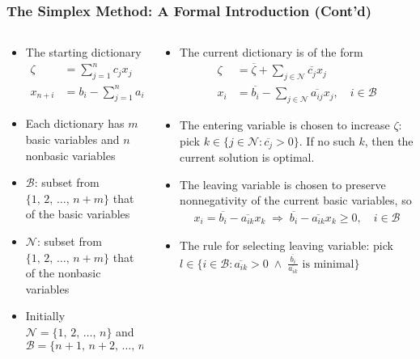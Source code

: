 \documentclass[usenames,dvipsnames,8pt]{beamer}%
\begin{document}
\begin{frame}
  \frametitle{The Simplex Method: A Formal Introduction (Cont'd)}
  \begin{columns}
    \begin{column}{0.5\textwidth}
      \vspace{-5mm}
      \begin{itemize}
        \item The starting dictionary
          \begin{align*}
            \zeta   &= \sum_{j=1}^n c_j x_j \\
            x_{n+i} &= b_i - \sum_{j=1}^n a_{ij}x_j,\quad i = 1, 2, \ldots, m
          \end{align*}
        \item Each dictionary has $m$ basic variables and $n$ nonbasic variables
        \item $\mathcal{B}$: subset from $\{1,\,2,\,\ldots,\,n+m\}$ that of the basic variables
        \item $\mathcal{N}$: subset from $\{1,\,2,\,\ldots,\,n+m\}$ that of the nonbasic variables
        \item Initially $\mathcal{N} = \{1,\,2,\,\ldots,\,n\}$ and $\mathcal{B} = \{n+1,\,n+2,\,\ldots,\,n+m\}$
      \end{itemize}
    \end{column}
    \hspace{-7mm}
    \begin{column}{0.5\textwidth}
      \begin{itemize}
        \item The current dictionary is of the form 
          \begin{align*}
            \zeta &= \overline{\zeta} + \sum_{j\in\mathcal{N}} \overline{c_j} x_j \\
            x_i   &= \overline{b_i} - \sum_{j\in\mathcal{N}}\overline{a_{ij}}x_j,\quad i\in\mathcal{B}
          \end{align*}
        \item The entering variable is chosen to increase $\zeta$: pick $k\in\{j\in\mathcal{N}: \overline{c_j} > 0\}$. If no such $k$, then the current solution is optimal.
        \item The leaving variable is chosen to preserve nonnegativity of the current basic variables, so 
          \begin{align*}
            x_i = \overline{b_i} - \overline{a_{ik}}x_k\;\Longrightarrow\; \overline{b_i} - \overline{a_{ik}}x_k\geqslant 0,\quad i\in\mathcal{B} 
          \end{align*}
        \item The rule for selecting leaving variable: pick $l\in\{i\in\mathcal{B}: \overline{a_{ik}} > 0\;\wedge\;\frac{\overline{b_i}}{\overline{a_{ik}}}\text{ is minimal}\}$ 
      \end{itemize}
    \end{column}
  \end{columns}
\end{frame}
\end{document}

